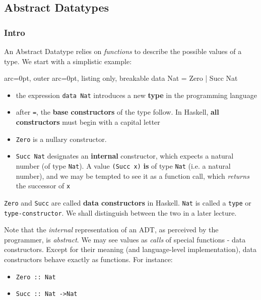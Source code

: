 \subsection*{ Abstract Datatypes }

\subsubsection*{ Intro }

An Abstract Datatype relies on \textit{functions} to describe the possible values of a type. We start with a simplistic example:


\begin{tcblisting}{ arc=0pt, outer arc=0pt, listing only, breakable}
data Nat = Zero | Succ Nat

\end{tcblisting}

\begin{itemize}
	\item  the expression \texttt{data Nat} introduces a new \textbf{type} in the programming language
	\item  after \texttt{=}, the \textbf{base constructors} of the type follow. In Haskell, \textbf{all constructors} must begin with a capital letter
	\item  \texttt{Zero} is a nullary constructor. 
	\item  \texttt{Succ Nat} designates an \textbf{internal} constructor, which expects a natural number (of type \texttt{Nat}). A value \texttt{(Succ x)} \textbf{is} of type \texttt{Nat} (i.e. a natural number), and we may be tempted to see it as a function call, which \textit{returns} the successor of \texttt{x}
\end{itemize}

\texttt{Zero} and \texttt{Succ} are called \textbf{data constructors} in Haskell. \texttt{Nat} is called a \texttt{type} or \texttt{type-constructor}. We shall distinguish between the two in a later lecture.

Note that the \textit{internal} representation of an ADT, as perceived by the programmer, is \textit{abstract}. We may see values as \textit{calls} of special functions - data constructors. Except for their meaning (and language-level implementation), data constructors behave exactly as functions. For instance:
\begin{itemize}
	\item  \texttt{Zero :: Nat}
	\item  \texttt{Succ :: Nat -\textgreater  Nat}
\end{itemize}

